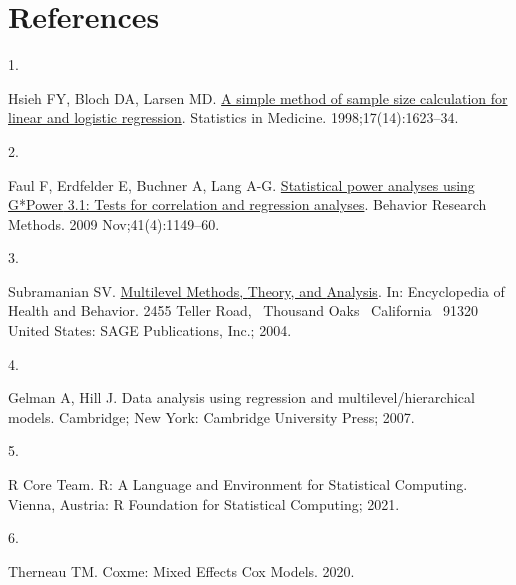 \documentclass[
  10pt,
]{article}
\newlength{\cslhangindent}
\newlength{\csllabelwidth}
\newlength{\cslentryspacingunit} %
\newenvironment{CSLReferences}[2] %
 {%
  \setlength{\parindent}{0pt}
  \ifodd #1
  \let\oldpar\par
  \def\par{\hangindent=\cslhangindent\oldpar}
  \fi
  \setlength{\parskip}{#2\cslentryspacingunit}
 }%
 {}
\newcommand{\CSLLeftMargin}[1]{\parbox[t]{\csllabelwidth}{#1}}
\newcommand{\CSLRightInline}[1]{\parbox[t]{\linewidth - \csllabelwidth}{#1}\break}
\begin{document}
\clearpage

\hypertarget{references}{%
\section*{References}\label{references}}

\hypertarget{refs}{}
\begin{CSLReferences}{0}{0}
\leavevmode{}%
\CSLLeftMargin{1. }
\CSLRightInline{Hsieh FY, Bloch DA, Larsen MD.
\href{https://doi.org/10.1002/(SICI)1097-0258(19980730)17:14\%3C1623::AID-SIM871\%3E3.0.CO;2-S}{A
simple method of sample size calculation for linear and logistic
regression}. Statistics in Medicine. 1998;17(14):1623--34. }

\leavevmode{}%
\CSLLeftMargin{2. }
\CSLRightInline{Faul F, Erdfelder E, Buchner A, Lang A-G.
\href{https://doi.org/10.3758/BRM.41.4.1149}{Statistical power analyses
using {G}*{Power} 3.1: Tests for correlation and regression analyses}.
Behavior Research Methods. 2009 Nov;41(4):1149--60. }

\leavevmode{}%
\CSLLeftMargin{3. }
\CSLRightInline{Subramanian SV.
\href{https://doi.org/10.4135/9781412952576.n151}{Multilevel {Methods},
{Theory}, and {Analysis}}. In: Encyclopedia of {Health} and {Behavior}.
{2455 Teller Road,~ Thousand Oaks~ California~ 91320~ United States}:
{SAGE Publications, Inc.}; 2004. }

\leavevmode{}%
\CSLLeftMargin{4. }
\CSLRightInline{Gelman A, Hill J. Data analysis using regression and
multilevel/hierarchical models. {Cambridge; New York}: {Cambridge
University Press}; 2007. }

\leavevmode{}%
\CSLLeftMargin{5. }
\CSLRightInline{R Core Team. R: A {Language} and {Environment} for
{Statistical Computing}. {Vienna, Austria}: {R Foundation for
Statistical Computing}; 2021. }

\leavevmode{}%
\CSLLeftMargin{6. }
\CSLRightInline{Therneau TM. Coxme: Mixed {Effects Cox Models}. 2020. }

\end{CSLReferences}
\end{document}
